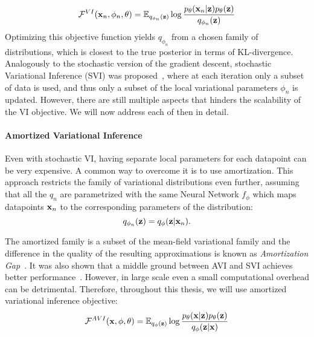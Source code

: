 \begin{equation}
     \mathcal{F}^{VI}({\mathbf{x}}_n, \phi_n, \theta) =  \mathbb{E}_{q_{\phi_n}({\mathbf{z}})}\log  \frac{p_{\theta}({\mathbf{x}}_n|{\mathbf{z}})p_{\theta}({\mathbf{z}})}{q_{\phi_n}({\mathbf{z}})}
\end{equation}
Optimizing this objective function yields $q_{\phi_n}$ from a chosen family of distributions, which is closest to the true posterior in terms of KL-divergence. Analogously to the stochastic version of the gradient descent, stochastic Variational Inference (SVI) was proposed~\citep{hoffman2013stochastic}, where at each iteration only a subset of data is used, and thus only a subset of the local variational parameters $\phi_n$ is updated. 
However, there are still multiple aspects that hinders the scalability of the VI objective. We will now address each of then in detail. 


\paragraph{Amortized Variational Inference}
Even with stochastic VI, having separate local parameters for each datapoint can be very expensive. 
A common way to overcome it is to use amortization. This approach restricts the family of variational distributions even further, assuming that all the $q_n$ are parametrized with the same Neural Network $f_{\phi}$ which maps datapoints ${\mathbf{x}}_n$ to the corresponding parameters of the distribution: 
\begin{equation}
    q_{\phi_n}({\mathbf{z}}) = q_{\phi}({\mathbf{z}} |{\mathbf{x}}_n).
\end{equation}

The amortized family is a subset of the mean-field variational family and the difference in the quality of the resulting approximations is known as \textit{Amortization Gap}~\citep{cremer2018inference}. It was also shown that a middle ground between AVI and SVI achieves better performance~\citep{kim2018semi}. However, in large scale even a small computational overhead can be detrimental. Therefore, throughout this thesis, we will use amortized variational inference objective:
\begin{equation}\label{eq:intro_avi}
     \mathcal{F}^{AVI}(\rvx, \phi, \theta) =  \E_{q_{\phi}(\rvz)}\log  \frac{p_{\theta}(\rvx|\rvz)p_{\theta}(\rvz)}{q_{\phi}(\rvz|\rvx)}
\end{equation}

